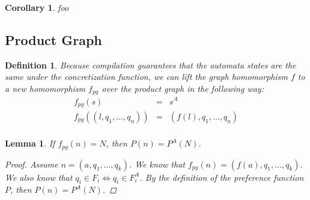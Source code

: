 \documentclass[twocolumn]{sig-alternate-10pt}
\newtheorem{defn}{Definition}
\newtheorem{lem}[thm]{Lemma}
\newtheorem*{cor}{Corollary}
\begin{document}
\begin{cor}
  foo
\end{cor}



\subsection{Product Graph}

\begin{defn}
  Because compilation guarantees that the automata states are the same under the concretization function, we can lift the graph homomorphism $f$ to a new homomorphism $f_{pg}$ over the product graph in the following way:
  \[ \begin{array}{rcl}
    f_{pg}( s ) & = & s^A  \\
    f_{pg}( (l,q_1,\ldots,q_n) ) & = & (f(l),q_1,\ldots,q_n) \\
  \end{array} \]
\end{defn}

\begin{lem}
  If $f_{pg}(n) = N$, then $P(n) = P^A(N)$.

  \begin{proof}
    Assume $n = (a,q_1,\dots,q_k)$. We know that $f_{pg}(n) = (f(a),q_1,\dots,q_k)$. 
    We also know that $q_i \in F_i \iff q_i \in F^A_i$. 
    By the definition of the preference function $P$, then $P(n) = P^A(N)$.
  \end{proof}

\end{lem}
\end{document}
